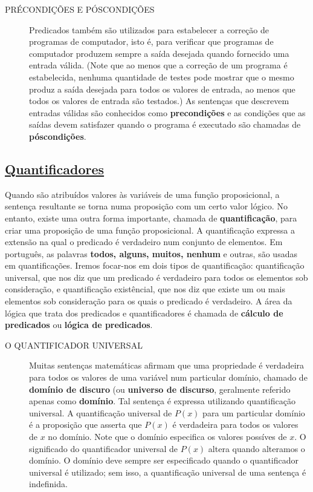 \begin{description}
\item[PRÉCONDIÇÕES E PÓSCONDIÇÕES] Predicados também são utilizados para
estabelecer a correção de programas de computador, isto é, para verificar que
programas de computador produzem sempre a saída desejada quando fornecido uma
entrada válida. (Note que ao menos que a correção de um programa é
estabelecida, nenhuma quantidade de testes pode mostrar que o mesmo produz a
saída desejada para todos os valores de entrada, ao menos que todos os valores
de entrada são testados.) As sentenças que descrevem entradas válidas são
conhecidos como \textbf{precondições} e as condições que as saídas devem
satisfazer quando o programa é executado são chamadas de
\textbf{póscondições}.
\end{description}


\subsection*{\underline{Quantificadores}}

Quando são atribuídos valores às variáveis de uma função proposicional, a
sentença resultante se torna numa proposição com um certo valor lógico. No
entanto, existe uma outra forma importante, chamada de \textbf{quantificação},
para criar uma proposição de uma função proposicional. A quantificação expressa
a extensão na qual o predicado é verdadeiro num conjunto de elementos. Em
português, as palavras \textbf{todos, alguns, muitos, nenhum} e outras, são
usadas em quantificações. Iremos focar-nos em dois tipos de quantificação:
quantificação universal, que nos diz que um predicado é verdadeiro para todos os
elementos sob consideração, e quantificação existêncial, que nos diz que existe
um ou mais elementos sob consideração para os quais o predicado é verdadeiro. A
área da lógica que trata dos predicados e quantificadores é chamada de
\textbf{cálculo de predicados} ou \textbf{lógica de predicados}.

\begin{description}
\item[O QUANTIFICADOR UNIVERSAL] Muitas sentenças matemáticas afirmam que uma
propriedade é verdadeira para todos os valores de uma variável num
particular domínio, chamado de \textbf{domínio de discuro} (ou
\textbf{universo de discurso}, geralmente referido apenas como
\textbf{domínio}. Tal sentença é expressa utilizando quantificação
universal. A quantificação universal de $P(x)$ para um particular domínio é a
proposição que asserta que $P(x)$ é verdadeira para todos os valores de $x$ no
domínio. Note que o domínio especifica os valores possíves de $x$. O significado
do quantificador universal de $P(x)$ altera quando alteramos o domínio. O
domínio deve sempre ser especificado quando o quantificador universal é
utilizado; sem isso, a quantificação universal de uma sentença é indefinida.
\end{description}

